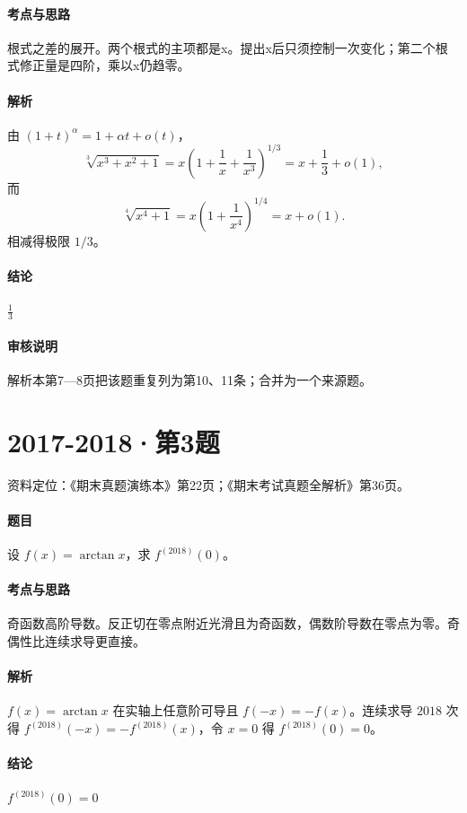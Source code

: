 \documentclass[UTF8,fontset=fandol,12pt,oneside,openany]{ctexrep}
\theoremstyle{definition}
\begin{document}
\paragraph{考点与思路}
根式之差的展开。两个根式的主项都是x。提出x后只须控制一次变化；第二个根式修正量是四阶，乘以x仍趋零。
\paragraph{解析}
由 $(1+t)^\alpha=1+\alpha t+o(t)$，\[\sqrt[3]{x^3+x^2+1}=x\left(1+\frac1x+\frac1{x^3}\right)^{1/3}=x+\frac13+o(1),\]而 \[\sqrt[4]{x^4+1}=x\left(1+\frac1{x^4}\right)^{1/4}=x+o(1).\]相减得极限 $1/3$。
\paragraph{结论}
$\frac13$
\paragraph{审核说明}
解析本第7—8页把该题重复列为第10、11条；合并为一个来源题。

\par\addvspace{18pt}\noindent\begin{minipage}{\linewidth}
\section{2017-2018·第3题}
\label{exam:08:q18}
资料定位：《期末真题演练本》第22页；《期末考试真题全解析》第36页。
\paragraph{题目}
设 $f(x)=\arctan x$，求 $f^{(2018)}(0)$。
\end{minipage}\par
\paragraph{考点与思路}
奇函数高阶导数。反正切在零点附近光滑且为奇函数，偶数阶导数在零点为零。奇偶性比连续求导更直接。
\paragraph{解析}
$f(x)=\arctan x$ 在实轴上任意阶可导且 $f(-x)=-f(x)$。连续求导 $2018$ 次得 $f^{(2018)}(-x)=-f^{(2018)}(x)$，令 $x=0$ 得 $f^{(2018)}(0)=0$。
\paragraph{结论}
$f^{(2018)}(0)=0$
\end{document}
